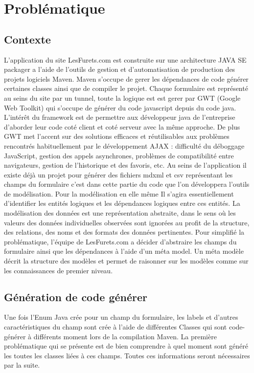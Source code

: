 \chapter{Problématique}

\section{Contexte}
L'application du site LesFurets.com est construite sur une architecture JAVA SE packager a l’aide de l'outils de gestion et d'automatisation de production des projets logiciels Maven. Maven s’occupe de gerer les dépendances de code générer certaines classes ainsi que de compiler le projet. Chaque formulaire est représenté au seins du site par un tunnel, toute la logique est est gerer par GWT (Google Web Toolkit) qui s’occupe de générer du code javascript depuis du code java. L'intérêt du framework est de permettre aux développeur java de l’entreprise d’aborder leur code coté client et coté serveur avec la même approche. De plus GWT met l'accent sur des solutions efficaces et réutilisables aux problèmes rencontrés habituellement par le développement AJAX : difficulté du déboggage JavaScript, gestion des appels asynchrones, problèmes de compatibilité entre navigateurs, gestion de l'historique et des favoris, etc.
Au seins de l’application il existe déjà un projet pour générer des fichiers mdxml et csv représentant les champs du formulaire c’est dans cette partie du code que l’on développera l’outils de modélisation.
Pour la modélisation en elle même Il s'agira essentiellement d'identifier les entités logiques et les dépendances logiques entre ces entités. La modélisation des données est une représentation abstraite, dans le sens où les valeurs des données individuelles observées sont ignorées au profit de la structure, des relations, des noms et des formats des données pertinentes.
Pour simplifié la problématique, l’équipe de LesFurets.com a décider d’abstraire les champs du formulaire ainsi que les dépendances à l’aide d'un méta model. Un méta modèle décrit la structure des modèles et permet de raisonner sur les modèles comme sur les connaissances de premier niveau.

\section{Génération de code générer}
Une fois l'Enum Java crée pour un champ du formulaire, les labels et d'autres caractéristiques du champ sont crée à l'aide de différentes Classes qui sont code-générer à différents moment lors de la compilation Maven. La première problématique qui se présente est de bien comprendre à quel moment sont généré les toutes les classes liées à ces champs. Toutes ces informations seront nécessaires par la suite.

